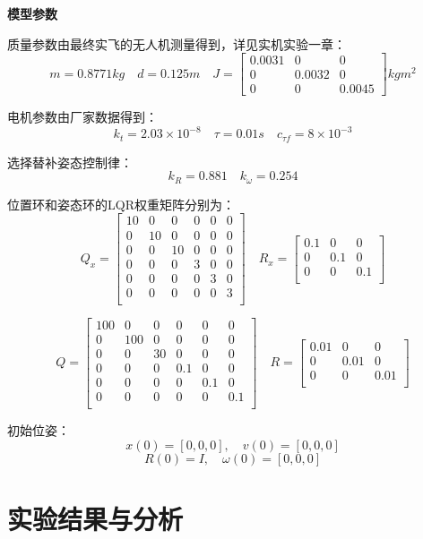   \textbf{模型参数}

  质量参数由最终实飞的无人机测量得到，详见实机实验一章：
  $$m=0.8771kg \quad d=0.125m \quad J=\begin{bmatrix}
    0.0031   &      0  &       0\\
    0 &   0.0032      &   0\\
    0  &       0   & 0.0045
  \end{bmatrix}kg m^2$$

  电机参数由厂家数据得到：
  $$k_t=2.03\times 10^{-8} \quad 
  \tau=0.01s \quad
  c_{\tau f}=8\times 10^{-3}$$

  选择替补姿态控制律：
  $$k_R=0.881 \quad k_\omega=0.254$$

  位置环和姿态环的LQR权重矩阵分别为：
  $$Q_x=\begin{bmatrix}
    10&0&0&0&0&0\\
    0&10&0&0&0&0\\
    0&0&10&0&0&0\\
    0&0&0&3&0&0\\
    0&0&0&0&3&0\\
    0&0&0&0&0&3\\
  \end{bmatrix} \quad R_x=\begin{bmatrix}
    0.1 &0 &0\\
    0 &0.1 &0\\
    0 &0 &0.1\\
  \end{bmatrix}$$

  $$Q=\begin{bmatrix}
    100&0&0&0&0&0\\
    0&100&0&0&0&0\\
    0&0&30&0&0&0\\
    0&0&0&0.1&0&0\\
    0&0&0&0&0.1&0\\
    0&0&0&0&0&0.1\\
  \end{bmatrix} \quad R=\begin{bmatrix}
    0.01 &0 &0\\
    0 &0.01 &0\\
    0 &0 &0.01\\
  \end{bmatrix}$$

  初始位姿：
  $$x(0)=[0,0,0],\quad v(0)=[0,0,0]$$
  $$R(0)=I , \quad \omega(0)=[0,0,0]$$

  \section{实验结果与分析}

